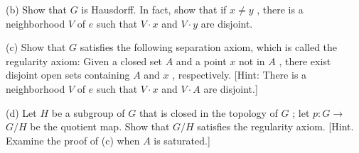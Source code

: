 (b) Show that \(G\) is Hausdorff. In fact, show that if \(x \neq  y\) , there is a neighborhood \(V\) of \(e\) such that \(V \cdot  x\) and \(V \cdot  y\) are disjoint.

(c) Show that \(G\) satisfies the following separation axiom, which is called the regularity axiom: Given a closed set \(A\) and a point \(x\) not in \(A\) , there exist disjoint open sets containing \(A\) and \(x\) , respectively. [Hint: There is a neighborhood \(V\) of \(e\) such that \(V \cdot  x\) and \(V \cdot  A\) are disjoint.]

(d) Let \(H\) be a subgroup of \(G\) that is closed in the topology of \(G\) ; let \(p : G \rightarrow\)  \(G/H\) be the quotient map. Show that \(G/H\) satisfies the regularity axiom. [Hint. Examine the proof of (c) when \(A\) is saturated.]